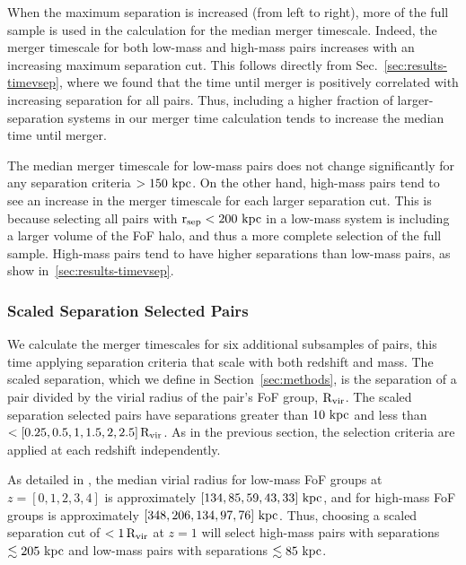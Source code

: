 \documentclass[twocolumn,linenumbers]{aastex631}
\newcommand{\chambe}{\citet{Chamberlain2024}}
\begin{document}
        When the maximum separation is increased (from left to right), more of the full sample is used in the calculation for the median merger timescale. 
        Indeed, the merger timescale for both low-mass and high-mass pairs increases with an increasing maximum separation cut.  
        This follows directly from Sec.~\ref{sec:results-timevsep}, where we found that the time until merger is positively correlated with increasing separation for all pairs. 
        Thus, including a higher fraction of larger-separation systems in our merger time calculation tends to increase the median time until merger. 
        
        The median merger timescale for low-mass pairs does not change significantly for any separation criteria $>150\,\mathrm{\,kpc}$. 
        On the other hand, high-mass pairs tend to see an increase in the merger timescale for each larger separation cut. 
        This is because selecting all pairs with $\rm r_{sep}<200\,\mathrm{\,kpc}$ in a low-mass system is including a larger volume of the FoF halo, and thus a more complete selection of the full sample.
        High-mass pairs tend to have higher separations than low-mass pairs, as show in~\ref{sec:results-timevsep}. 

    \subsubsection{Scaled Separation Selected Pairs}
    \label{sec:results-scal}
        We calculate the merger timescales for six additional subsamples of pairs, this time applying separation criteria that scale with both redshift and mass.
        The scaled separation, which we define in Section~\ref{sec:methods},  is the separation of a pair divided by the virial radius of the pair's FoF group, $\rm R_{vir}$. 
        The scaled separation selected pairs have separations greater than $10\,\mathrm{\,kpc}$ and less than $<[0.25, 0.5, 1, 1.5, 2, 2.5]\,\rm R_{vir}$. 
        As in the previous section, the selection criteria are applied at each redshift independently. 
        
        As detailed in \chambe{}, the median virial radius for low-mass FoF groups at $z=[0,1,2,3,4]$ is approximately $[134, 85, 59, 43, 33]\,\mathrm{\,kpc}$, and for high-mass FoF groups is approximately $[348, 206, 134, 97, 76]\,\mathrm{\,kpc}$.
        Thus, choosing a scaled separation cut of $<1\,\rm R_{vir}$ at $z=1$ will select high-mass pairs with separations $\lesssim205\,\mathrm{\,kpc}$ and low-mass pairs with separations $\lesssim85\,\mathrm{\,kpc}$.
        
\end{document}
